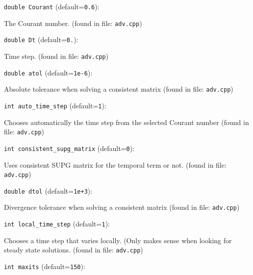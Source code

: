 \item\verb+double Courant+ {\rm(default=\verb|0.6|)}:

The Courant number.
 (found in file: \verb+adv.cpp+)
\item\verb+double Dt+ {\rm(default=\verb|0.|)}:

Time step. 
 (found in file: \verb+adv.cpp+)
\item\verb+double atol+ {\rm(default=\verb|1e-6|)}:

Absolute tolerance when solving a consistent matrix
 (found in file: \verb+adv.cpp+)
\item\verb+int auto_time_step+ {\rm(default=\verb|1|)}:

Chooses automatically the time step from the 
selected Courant number
 (found in file: \verb+adv.cpp+)
\item\verb+int consistent_supg_matrix+ {\rm(default=\verb|0|)}:

Uses consistent SUPG matrix for the temporal term or not. 
 (found in file: \verb+adv.cpp+)
\item\verb+double dtol+ {\rm(default=\verb|1e+3|)}:

Divergence tolerance when solving a consistent matrix
 (found in file: \verb+adv.cpp+)
\item\verb+int local_time_step+ {\rm(default=\verb|1|)}:

Chooses a time step that varies locally. (Only makes sense
when looking for steady state solutions. 
 (found in file: \verb+adv.cpp+)
\item\verb+int maxits+ {\rm(default=\verb|150|)}:

